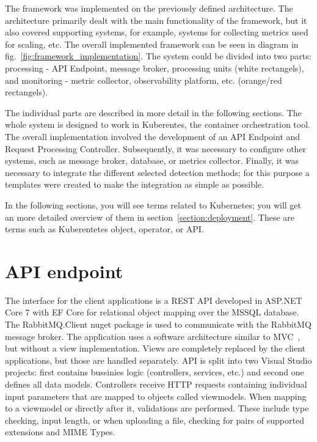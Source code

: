 The framework was implemented on the previously defined architecture. The architecture primarily dealt with the main functionality of the framework, but it also covered supporting systems, for example, systems for collecting metrics used for scaling, etc. The overall implemented framework can be seen in diagram in fig.~\ref{fig:framework_implementation}. The system could be divided into two parts: processing - API Endpoint, message broker, processing units (white rectangels), and monitoring - metric collector, observability platform, etc. (orange/red rectangels).

The individual parts are described in more detail in the following sections. The whole system is designed to work in Kuberentes, the container orchestration tool. The overall implementation involved the development of an API Endpoint and Request Processing Controller. Subsequently, it was necessary to configure other systems, such as message broker, database, or metrics collector. Finally, it was necessary to integrate the different selected detection methods; for this purpose a templates were created to make the integration as simple as possible.

In the following sections, you will see terms related to Kubernetes; you will get an more detailed overview of them in section~\ref{section:deployment}. These are terms such as Kuberentetes object, operator, or API.

\section{API endpoint}

The interface for the client applications is a REST API developed in ASP.NET Core 7 with EF Core for relational object mapping over the MSSQL database. The RabbitMQ.Client nuget package is used to communicate with the RabbitMQ message broker. The application uses a software architecture similar to MVC~\cite{MVC}, but without a view implementation. Views are completely replaced by the client applications, but those are handled separately. API is split into two Visual Studio projects: first contains bussinies logic (controllers, services, etc.) and second one defines all data models. Controllers receive HTTP requests containing individual input parameters that are mapped to objects called viewmodels. When mapping to a viewmodel or directly after it, validations are performed. These include type checking, input length, or when uploading a file, checking for pairs of supported extensions and MIME Types.

